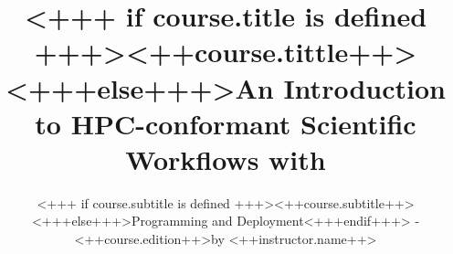 \documentclass[english,xcolor=pdftex,dvipsnames,aspectratio=<+++ if course.aspectratio is defined +++><++course.aspectratio++><+++else+++>43<+++endif+++>]{beamer}
\title[<++course.shorttitle++>]{<+++ if course.title is defined +++><++course.tittle++><+++else+++>An Introduction to HPC-conformant Scientific Workflows with \Snakemake<+++endif+++>}
\subtitle{<+++ if course.subtitle is defined +++><++course.subtitle++><+++else+++>Programming and Deployment<+++endif+++> - <++course.edition++>\newline by <++instructor.name++>}
\begin{document}

\sloppy

\begin{frame}[plain] %
  \titlepage
\end{frame}


























% 
\end{document}
